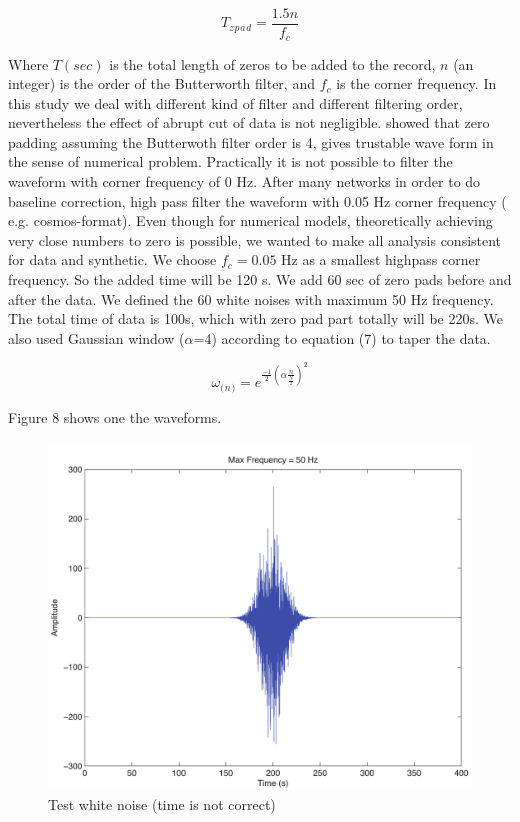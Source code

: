 \documentclass{article}
\begin{document}
\begin{equation}
T{_z{_p{_a{_d}}}} = \frac{1.5n}{f_c}
\end{equation}

Where $T(sec)$ is the total length of zeros to be added to the record, $n$ (an integer) is the order of the Butterworth filter, and $f_c$ is the corner frequency. In this study we deal with different kind of filter and different filtering order, nevertheless the effect of abrupt cut of data is not negligible. \citet{Boore_2005} showed that zero padding assuming the Butterwoth filter order is 4, gives trustable wave form in the sense of numerical problem. Practically it is not possible to filter the waveform with corner frequency of 0 Hz. After \citet{Trifunac_1971}  many networks in order to do baseline correction, high pass filter the waveform  with 0.05 Hz corner frequency ( e.g. cosmos-format). Even though for numerical models, theoretically achieving very close numbers to zero is possible, we wanted to make all analysis consistent for data and synthetic. We choose $f_c= 0.05$ Hz as a smallest highpass corner frequency. So the added time will be 120 s. We add 60 sec of zero pads before and after the data. We defined the 60 white noises with maximum 50 Hz frequency. The total time of data is 100s, which with zero pad part totally will be 220s. We also used Gaussian window ($\alpha$=4) according to equation (7) to taper the data. 

\begin{equation}
\omega{_({_n{_)}}} = e ^ {\frac{-1}{2}(\alpha \frac{n}{\frac{N}{2}})^2}
\end{equation}

Figure 8 shows one the waveforms.

\begin{figure} [H]
\begin{center}  
\includegraphics[scale=0.6]{figures/pdf/figure8.pdf} 
\caption{Test white noise (\textcolor{red!50!black}{time is not correct)}}
\end{center}   
\end{figure}
\end{document}
